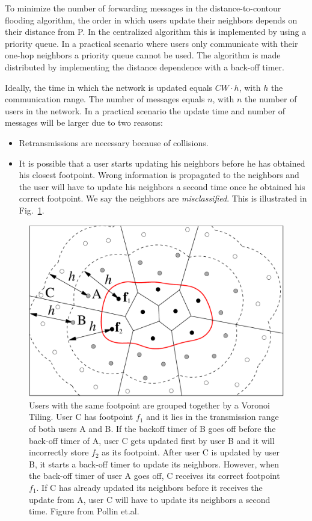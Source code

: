 To minimize the number of forwarding messages in the distance-to-contour flooding algorithm, the order in which users update their neighbors depends on their distance from P. In the centralized algorithm this is implemented by using a priority queue. In a practical scenario where users only communicate with their one-hop neighbors a priority queue cannot be used. The algorithm is made distributed by implementing the distance dependence with a back-off timer. 

Ideally, the time in which the network is updated equals $CW \cdot h$, with $h$ the communication range. The number of messages equals $n$, with $n$ the number of users in the network. In a practical scenario the update time and number of messages will be larger due to two reasons: 
 
\begin{itemize}
 \item Retransmissions are necessary because of collisions.
\item It is possible that a user starts updating his neighbors before he has obtained his closest footpoint. Wrong information is propagated to the neighbors and the user will have to update his neighbors a second time once he obtained his correct footpoint. We say the neighbors are \textit{misclassified}. This is illustrated in Fig.~\ref{fig:misclass}.
\end{itemize}

\begin{figure}
\centering
\includegraphics[scale=0.25]{figures/algorithm/proof2}
\caption{\label{fig:misclass}Users with the same footpoint are grouped together by a Voronoi Tiling. User C has footpoint $f_1$ and it lies in the transmission range of both users A and B. If the backoff timer of B goes off before the back-off timer of A, user C gets updated first by user B and it will incorrectly store $f_2$ as its footpoint. After user C is updated by user B, it starts a back-off timer to update its neighbors. However, when the back-off timer of user A goes off, C receives its correct footpoint $f_1$. If C has already updated its neighbors before it receives the update from A, user C will have to update its neighbors a second time. Figure from Pollin et.al. \cite{sofie} }
\end{figure}

